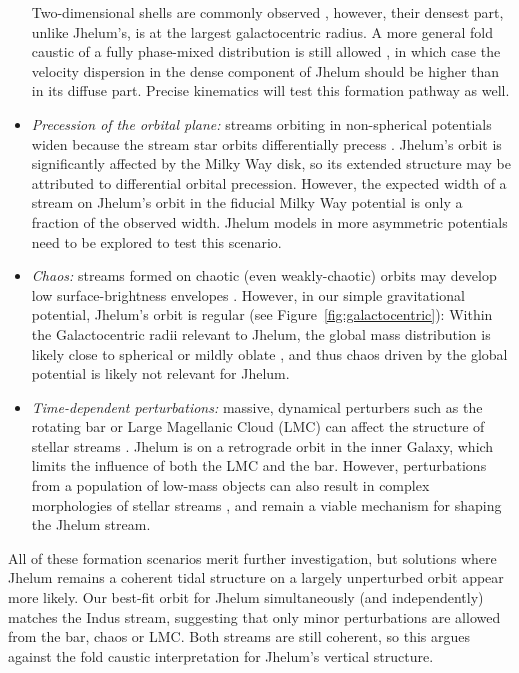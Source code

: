 \documentclass[twocolumn]{aastex62}
\begin{document}
\begin{itemize}
{ Two-dimensional shells are commonly observed \citep[e.g.,][]{tal2009,kadofong2018}, however, their densest part, unlike Jhelum's, is at the largest galactocentric radius.
 A more general fold caustic of a fully phase-mixed distribution is still allowed \citep[e.g.,][]{tremaine1999}, in which case the velocity dispersion in the dense component of Jhelum should be higher than in its diffuse part.
 Precise kinematics will test this formation pathway as well.
 }
 \item{\emph{Precession of the orbital plane:} streams orbiting in non-spherical potentials widen because the stream star orbits differentially precess \citep[e.g.,][]{erkal2016, dehnen2018}.
 Jhelum's orbit is significantly affected by the Milky Way disk, so its extended structure may be attributed to differential orbital precession.
 However, the expected width of a stream on Jhelum's orbit in the fiducial Milky Way potential is only a fraction of the observed width.
 Jhelum models in more asymmetric potentials need to be explored to test this scenario.
 }
 \item{\emph{Chaos:} streams formed on chaotic (even weakly-chaotic) orbits may develop low surface-brightness envelopes \citep[e.g.,][]{pw2016}.
 However, in our simple gravitational potential, Jhelum's orbit is regular (see Figure~\ref{fig:galactocentric}):
 Within the Galactocentric radii relevant to Jhelum, the global mass distribution is likely close to spherical or mildly oblate \citep[e.g.,][]{kupper2015}, and thus chaos driven by the global potential is likely not relevant for Jhelum.
 }
 \item{\emph{Time-dependent perturbations:} massive, dynamical perturbers such as the rotating bar or Large Magellanic Cloud (LMC) can affect the structure of stellar streams \citep[e.g.,][]{pw2016b, pearson2017, erkal2019}.
 Jhelum is on a retrograde orbit in the inner Galaxy, which limits the influence of both the LMC and the bar.
 However, perturbations from a population of low-mass objects can also result in complex morphologies of stellar streams \citep[e.g.,][]{bonaca2014}, and remain a viable mechanism for shaping the Jhelum stream.
 }
\end{itemize}

All of these formation scenarios merit further investigation, but solutions where Jhelum remains a coherent tidal structure on a largely unperturbed orbit appear more likely.
Our best-fit orbit for Jhelum simultaneously (and independently) matches the Indus stream, suggesting that only minor perturbations are allowed from the bar, chaos or LMC.
Both streams are still coherent, so this argues against the fold caustic interpretation for Jhelum's vertical structure.
\end{document}
